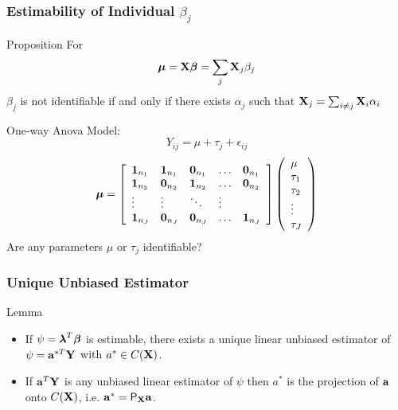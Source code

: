 \documentclass[handout]{beamer}
\begin{document}
\begin{frame}
  \frametitle{Estimability of Individual $\beta_j$}
  \begin{block}{Proposition}
For    $$\boldsymbol{\mu} = \mathbf{X} \boldsymbol{\beta} = \sum_j \mathbf{X}_j \beta_j$$
$\beta_j$ is not identifiable  if and only if there exists $\alpha_j$
such that $\mathbf{X}_j = \sum_{i \neq j} \mathbf{X}_i \alpha_i$
  \end{block} \pause
One-way Anova Model:
$$Y_{ij} = \mu + \tau_j + \epsilon_{ij}$$
  $$ \boldsymbol{\mu} =  \left[
    \begin{array}{lllll}
\mathbf{1}_{n_1} & \mathbf{1}_{n_1} & \mathbf{0}_{n_1} &  \ldots & \mathbf{0}_{n_1} \\
\mathbf{1}_{n_2} & \mathbf{0}_{n_2} & \mathbf{1}_{n_2} &  \ldots & \mathbf{0}_{n_2} \\
\vdots & \vdots & \ddots & \vdots \\
\mathbf{1}_{n_J} & \mathbf{0}_{n_J} & \mathbf{0}_{n_J} &  \ldots & \mathbf{1}_{n_J} \\
    \end{array} \right]
 \left(   \begin{array}{l}
      \mu \\
      \tau_1 \\
   \tau_2 \\
 \vdots \\
\tau_J
    \end{array} \right)
$$\pause
Are any parameters $\mu$ or $\tau_j$ identifiable?
\end{frame}
\begin{frame}
  \frametitle{Unique Unbiased Estimator}
  \begin{block}{Lemma}
    \begin{itemize}
    \item 
    If   $\psi = \boldsymbol{\lambda}^T \boldsymbol{\beta}$ is estimable, there exists a unique
    linear unbiased estimator of $\psi = \mathbf{a}^{*T}\mathbf{Y}$ with $a^* \in
    C(\mathbf{X})$. \pause 
\item If $\mathbf{a}^T\mathbf{Y}$ is any unbiased linear estimator of $\psi$
    then $a^*$ is the projection of $\mathbf{a}$ onto $C(\mathbf{X})$, i.e. $\mathbf{a}^* =
    \textsf{P}_{\mathbf{X}} \mathbf{a}$.
    \end{itemize}

  \end{block} 
      \end{frame}
\end{document}
